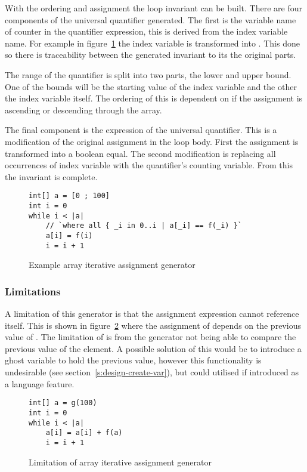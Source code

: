 With the ordering and assignment the loop invariant can be built.
There are four components of the universal quantifier generated.
The first is the variable name of counter in the quantifier expression,
this is derived from the index variable name.
For example in figure~\ref{lst:array-iter-assign} the index
variable  is transformed into .
This done so there is traceability between the generated invariant to
its the original parts.

The range of the quantifier is split into two parts, the lower and upper
bound. One of the bounds will be the starting value of the index variable
and the other the index variable itself.
The ordering of this is dependent on if the assignment is ascending or 
descending through the array.

The final component is the expression of the universal quantifier.
This is a modification of the original assignment in the loop body.
First the assignment is transformed into a boolean equal.
The second modification is replacing all occurrences of index variable
with the quantifier's counting variable.
From this the invariant is complete.  

\begin{figure}
\begin{lstlisting}
int[] a = [0 ; 100]
int i = 0
while i < |a|
	// `where all { _i in 0..i | a[_i] == f(_i) }`
	a[i] = f(i)
	i = i + 1
\end{lstlisting}
\caption{Example array iterative assignment generator}
\label{lst:array-iter-assign}
\end{figure}

\subsubsection{Limitations}

A limitation of this generator is that the assignment expression cannot
reference itself.
This is shown in figure~\ref{lst:limit-array-iter-assign} where the assignment
of  depends on the previous value of .
The limitation of is from the generator not being able to compare the previous
value of the element.
A possible solution of this would be to introduce a ghost variable to hold the
previous value, however this functionality is undesirable (see section~\ref{s:design-create-var}),
but could utilised if introduced as a language feature.


\begin{figure}
\begin{lstlisting}
int[] a = g(100)
int i = 0
while i < |a|
	a[i] = a[i] + f(a)
	i = i + 1
\end{lstlisting}
\caption{Limitation of array iterative assignment generator}
\label{lst:limit-array-iter-assign}
\end{figure}
